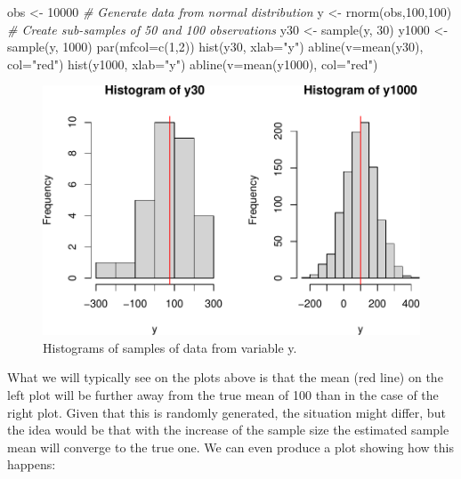 \documentclass[
]{book}
\newenvironment{Shaded}{\begin{snugshade}}{\end{snugshade}}
\newcommand{\AttributeTok}[1]{\textcolor[rgb]{0.77,0.63,0.00}{#1}}
\newcommand{\CommentTok}[1]{\textcolor[rgb]{0.56,0.35,0.01}{\textit{#1}}}
\newcommand{\DecValTok}[1]{\textcolor[rgb]{0.00,0.00,0.81}{#1}}
\newcommand{\FunctionTok}[1]{\textcolor[rgb]{0.00,0.00,0.00}{#1}}
\newcommand{\NormalTok}[1]{#1}
\newcommand{\OtherTok}[1]{\textcolor[rgb]{0.56,0.35,0.01}{#1}}
\newcommand{\StringTok}[1]{\textcolor[rgb]{0.31,0.60,0.02}{#1}}
\theoremstyle{definition}
\theoremstyle{definition}
\theoremstyle{definition}
\theoremstyle{definition}
\theoremstyle{remark}
\begin{document}
\begin{Shaded}
\begin{Highlighting}[]
\NormalTok{obs }\OtherTok{\textless{}{-}} \DecValTok{10000}
\CommentTok{\# Generate data from normal distribution}
\NormalTok{y }\OtherTok{\textless{}{-}} \FunctionTok{rnorm}\NormalTok{(obs,}\DecValTok{100}\NormalTok{,}\DecValTok{100}\NormalTok{)}
\CommentTok{\# Create sub{-}samples of 50 and 100 observations}
\NormalTok{y30 }\OtherTok{\textless{}{-}} \FunctionTok{sample}\NormalTok{(y, }\DecValTok{30}\NormalTok{)}
\NormalTok{y1000 }\OtherTok{\textless{}{-}} \FunctionTok{sample}\NormalTok{(y, }\DecValTok{1000}\NormalTok{)}
\FunctionTok{par}\NormalTok{(}\AttributeTok{mfcol=}\FunctionTok{c}\NormalTok{(}\DecValTok{1}\NormalTok{,}\DecValTok{2}\NormalTok{))}
\FunctionTok{hist}\NormalTok{(y30, }\AttributeTok{xlab=}\StringTok{"y"}\NormalTok{)}
\FunctionTok{abline}\NormalTok{(}\AttributeTok{v=}\FunctionTok{mean}\NormalTok{(y30), }\AttributeTok{col=}\StringTok{"red"}\NormalTok{)}
\FunctionTok{hist}\NormalTok{(y1000, }\AttributeTok{xlab=}\StringTok{"y"}\NormalTok{)}
\FunctionTok{abline}\NormalTok{(}\AttributeTok{v=}\FunctionTok{mean}\NormalTok{(y1000), }\AttributeTok{col=}\StringTok{"red"}\NormalTok{)}
\end{Highlighting}
\end{Shaded}

\begin{figure}
\centering
\includegraphics{Svetunkov---Statistics-for-Business-Analytics_files/figure-latex/histY30Y1000-1.pdf}
\caption{\label{fig:histY30Y1000}Histograms of samples of data from variable y.}
\end{figure}

What we will typically see on the plots above is that the mean (red line) on the left plot will be further away from the true mean of 100 than in the case of the right plot. Given that this is randomly generated, the situation might differ, but the idea would be that with the increase of the sample size the estimated sample mean will converge to the true one. We can even produce a plot showing how this happens:
\end{document}
